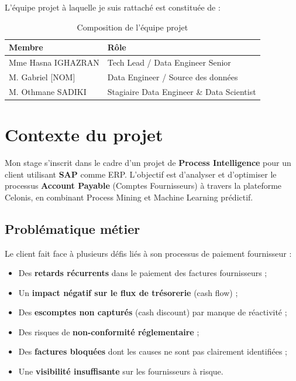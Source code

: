 \noindent L'équipe projet à laquelle je suis rattaché est constituée de :

\begin{table}[htbp]
    \centering
    \begin{tabular}{|l|l|}
        \hline
        \textbf{Membre} & \textbf{Rôle} \\
        \hline
        Mme Hasna IGHAZRAN & Tech Lead / Data Engineer Senior \\
        \hline
        M. Gabriel [NOM] & Data Engineer / Source des données \\
        \hline
        M. Othmane SADIKI & Stagiaire Data Engineer \& Data Scientist \\
        \hline
    \end{tabular}
    \caption{Composition de l'équipe projet}
    \label{tab:equipe}
\end{table}

\section{Contexte du projet}

Mon stage s'inscrit dans le cadre d'un projet de \textbf{Process Intelligence} pour un client utilisant \textbf{SAP} comme ERP. L'objectif est d'analyser et d'optimiser le processus \textbf{Account Payable} (Comptes Fournisseurs) à travers la plateforme Celonis, en combinant Process Mining et Machine Learning prédictif.

\subsection{Problématique métier}

Le client fait face à plusieurs défis liés à son processus de paiement fournisseur :

\begin{itemize}
    \item Des \textbf{retards récurrents} dans le paiement des factures fournisseurs ;
    \item Un \textbf{impact négatif sur le flux de trésorerie} (cash flow) ;
    \item Des \textbf{escomptes non capturés} (cash discount) par manque de réactivité ;
    \item Des risques de \textbf{non-conformité réglementaire} ;
    \item Des \textbf{factures bloquées} dont les causes ne sont pas clairement identifiées ;
    \item Une \textbf{visibilité insuffisante} sur les fournisseurs à risque.
\end{itemize}

